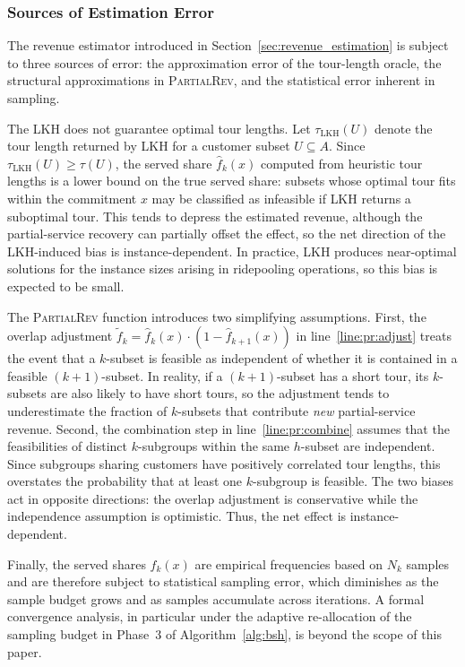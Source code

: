 \documentclass[11pt]{article}
\theoremstyle{plain}
\theoremstyle{definition}
\begin{document}
	\subsubsection{Sources of Estimation Error}\label{sec:estimation_error}
	The revenue estimator introduced in Section~\ref{sec:revenue_estimation} is subject to three sources of error: the approximation error of the tour-length oracle, the structural approximations in \textsc{PartialRev}, and the statistical error inherent in sampling.

	The \ac{LKH} does not guarantee optimal tour lengths.
	Let $\tau_{\mathrm{LKH}}(U)$ denote the tour length returned by \ac{LKH} for a customer subset $U \subseteq A$.
	Since $\tau_{\mathrm{LKH}}(U) \geq \tau(U)$, the served share $\hat{f}_k(x)$ computed from heuristic tour lengths is a lower bound on the true served share: subsets whose optimal tour fits within the commitment $x$ may be classified as infeasible if \ac{LKH} returns a suboptimal tour.
	This tends to depress the estimated revenue, although the partial-service recovery can partially offset the effect, so the net direction of the \ac{LKH}-induced bias is instance-dependent.
	In practice, \ac{LKH} produces near-optimal solutions for the instance sizes arising in ridepooling operations, so this bias is expected to be small.
	
	The \textsc{PartialRev} function introduces two simplifying assumptions.
	First, the overlap adjustment $\tilde{f}_k = \hat{f}_k(x) \cdot (1 - \hat{f}_{k+1}(x))$ in line~\ref{line:pr:adjust} treats the event that a $k$-subset is feasible as independent of whether it is contained in a feasible $(k+1)$-subset.
	In reality, if a $(k+1)$-subset has a short tour, its $k$-subsets are also likely to have short tours, so the adjustment tends to underestimate the fraction of $k$-subsets that contribute \emph{new} partial-service revenue.
	Second, the combination step in line~\ref{line:pr:combine} assumes that the feasibilities of distinct $k$-subgroups within the same $h$-subset are independent.
	Since subgroups sharing customers have positively correlated tour lengths, this overstates the probability that at least one $k$-subgroup is feasible.
	The two biases act in opposite directions: the overlap adjustment is conservative while the independence assumption is optimistic. Thus, the net effect is instance-dependent.

	Finally, the served shares $\hat{f}_k(x)$ are empirical frequencies based on $N_k$ samples and are therefore subject to statistical sampling error, which diminishes as the sample budget grows and as samples accumulate across iterations. A formal convergence analysis, in particular under the adaptive re-allocation of the sampling budget in Phase~3 of Algorithm~\ref{alg:bsh}, is beyond the scope of this paper.
\end{document}
